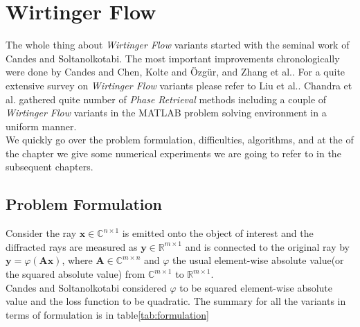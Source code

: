 \chapter{Wirtinger Flow}

The whole thing about \emph{Wirtinger Flow} variants started with the seminal work of Candes and Soltanolkotabi\cite{Candes2014}.
The most important improvements chronologically were done by Candes and Chen\cite{Chen2015}, Kolte and Özgür\cite{Kolte2016}, and Zhang et al.\cite{Zhang2016}.
For a quite extensive survey on \emph{Wirtinger Flow} variants please refer to Liu et al.\cite{Liu2019}. Chandra et al.\cite{Chandra2017} 
gathered quite number of \emph{Phase Retrieval} methods including a couple of \emph{Wirtinger Flow} variants in the MATLAB\textregistered\space 
problem solving environment in a uniform manner.\\
We quickly go over the problem formulation, difficulties, algorithms, and at the of the chapter we give some numerical experiments we are going
to refer to in the subsequent chapters.

\section{Problem Formulation}
Consider the ray $\boldsymbol{x} \in \mathbb{C}^{n \times 1}$ is emitted onto the object of interest and the diffracted rays are measured as 
$\boldsymbol{y} \in \mathbb{R}^{m \times 1}$ and is connected to the original ray by $\boldsymbol{y} = \varphi(\boldsymbol{A}\boldsymbol{x})$,
where $\boldsymbol{A} \in \mathbb{C}^{m \times n}$ and $\varphi$ the usual element-wise absolute value(or the squared absolute value) from 
$\mathbb{C}^{m \times 1}$ to $\mathbb{R}^{m \times 1}$.\\
Candes and Soltanolkotabi\cite{Candes2014} considered $\varphi$ to be squared element-wise absolute value and the loss function to be quadratic. 
The summary for all the variants in terms of formulation is in table\ref{tab:formulation}  


